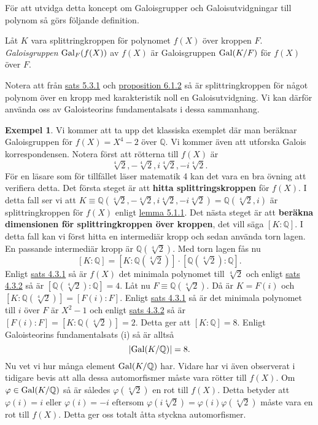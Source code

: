 \documentclass{article}
\newcommand{\gal}[0]{\textnormal{Gal}}
\theoremstyle{definition}
\newtheorem{exmp}[thm]{Exempel}
\begin{document}
För att utvidga detta koncept om Galoisgrupper och Galoisutvidgningar till polynom så görs följande definition.
\begin{mydef}{}{}
  Låt $K$ vara splittringkroppen för polynomet $f(X)$ över kroppen $F$. \textit{Galoisgruppen} $\gal_F(f(X))$ av $f(X)$ är Galoisgruppen 
  $\gal(K/F)$ för $f(X)$ över $F$. 
\end{mydef}
Notera att från \hyperlink{sats6.3.1}{sats 5.3.1} och \hyperlink{prop7.1.2}{proposition 6.1.2} så är splittringkroppen för något polynom över en kropp med 
karakteristik noll en Galoisutvidgning. Vi kan därför använda oss av Galoisteorins fundamentalsats i dessa sammanhang. 
\begin{exmp}
  Vi kommer att ta upp det klassiska exemplet där man beräknar Galoisgruppen för $f(X) = X^4 -2$ över $\mathbb{Q}$. Vi kommer även att 
  utforska Galois korrespondensen. Notera först att rötterna till $f(X)$ är 
  \[ \sqrt[4]{2}, -\sqrt[4]{2}, i\sqrt[4]{2}, -i\sqrt[4]{2}.  \]
  För en läsare som för tillfället läser matematik 4 kan det vara en bra övning att verifiera detta.
  Det första steget är att \textbf{hitta splittringskroppen} för $f(X)$. I detta fall ser vi att 
  $K \equiv \mathbb{Q}(\sqrt[4]{2}, -\sqrt[4]{2}, i\sqrt[4]{2}, -i\sqrt[4]{2}) = \mathbb{Q}(\sqrt[4]{2}, i)$
  är splittringkroppen för $f(X)$ enligt \hyperlink{lemma6.0.1}{lemma 5.1.1}. Det nästa steget är att \textbf{beräkna dimensionen för 
  splittringkroppen över kroppen}, det vill säga $[K:\mathbb{Q}]$. I detta fall kan vi först hitta en intermediär kropp 
  och sedan använda torn lagen. En passande intermediär kropp är $\mathbb{Q}(\sqrt[4]{2})$. Med torn lagen fås nu 
  \[ [K:\mathbb{Q}] = [K: \mathbb{Q}(\sqrt[4]{2})] \cdot [\mathbb{Q}(\sqrt[4]{2}): \mathbb{Q}]. \]
  Enligt \hyperlink{minpol}{sats 4.3.1} så är $f(X)$ det minimala polynomet till $\sqrt[4]{2}$ och enligt \hyperlink{5.3.2}{sats 4.3.2} 
  så är $[\mathbb{Q}(\sqrt[4]{2}): \mathbb{Q}] = 4$. Låt nu $F \equiv \mathbb{Q}(\sqrt[4]{2})$. Då är $K = F(i)$ och 
  $[K: \mathbb{Q}(\sqrt[4]{2})] = [F(i): F]$. Enligt \hyperlink{minpol}{sats 4.3.1} så är det minimala polynomet till $i$ över $F$ är $X^2 - 1$ och enligt 
  \hyperlink{5.3.2}{sats 4.3.2} så är $[F(i): F] = [K: \mathbb{Q}(\sqrt[4]{2})] = 2$. Detta ger att $[K:\mathbb{Q}] = 8$.
  Enligt Galoisteorins fundamentalsats (i) så är alltså 
  \[|\gal(K/\mathbb{Q})| = 8.\]
  Nu vet vi hur många element $\gal(K/\mathbb{Q})$ har. Vidare har vi även observerat i tidigare bevis att alla dessa automorfismer 
  måste vara rötter till $f(X)$. Om $\varphi \in \gal(K/\mathbb{Q})$ så är således $\varphi(\sqrt[4]{2})$ en rot till $f(X)$. Detta betyder att 
  $\varphi(i) = i$ eller $\varphi(i) = -i$ eftersom $\varphi(i \sqrt[4]{2}) = \varphi(i) \varphi(\sqrt[4]{2})$ måste vara en rot till $f(X)$. Detta ger 
  oss totalt åtta styckna automorfismer.


\end{exmp}
\end{document}
